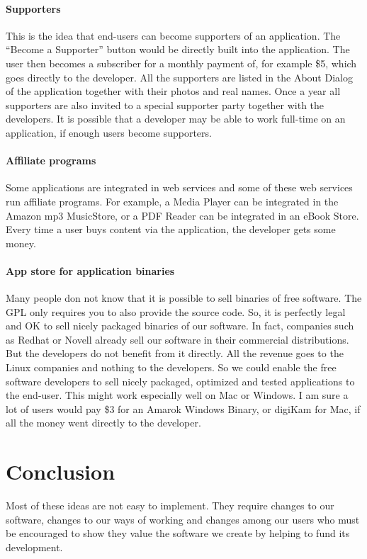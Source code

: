 \paragraph*{Supporters}

This is the idea that end-users can become supporters of an application. The ``Become a Supporter'' button would be directly built into the application. The user then becomes a subscriber for a monthly payment of, for example \$5, which goes directly to the developer. All the supporters are listed in the About Dialog of the application together with their photos and real names. Once a year all supporters are also invited to a special supporter party together with the developers. It is possible that a developer may be able to work full-time on an application, if enough users become supporters.

\paragraph*{Affiliate programs}

Some applications are integrated in web services and some of these web services run affiliate programs. For example, a Media Player can be integrated in the Amazon mp3 MusicStore, or a PDF Reader can be integrated in an eBook Store. Every time a user buys content via the application, the developer gets some money.

\paragraph*{App store for application binaries}

Many people don not know that it is possible to sell binaries of free software. The GPL only requires you to also provide the source code. So, it is perfectly legal and OK to sell nicely packaged binaries of our software. In fact, companies such as Redhat or Novell already sell our software in their commercial distributions. But the developers do not benefit from it directly. All the revenue goes to the Linux companies and nothing to the developers. So we could enable the free software developers to sell nicely packaged, optimized and tested applications to the end-user. This might work especially well on Mac or Windows. I am sure a lot of users would pay \$3 for an Amarok Windows Binary, or digiKam for Mac, if all the money went directly to the developer.

\section*{Conclusion}
Most of these ideas are not easy to implement. They require changes to our software, changes to our ways of working and changes among our users who must be encouraged to show they value the software we create by helping to fund its development.

